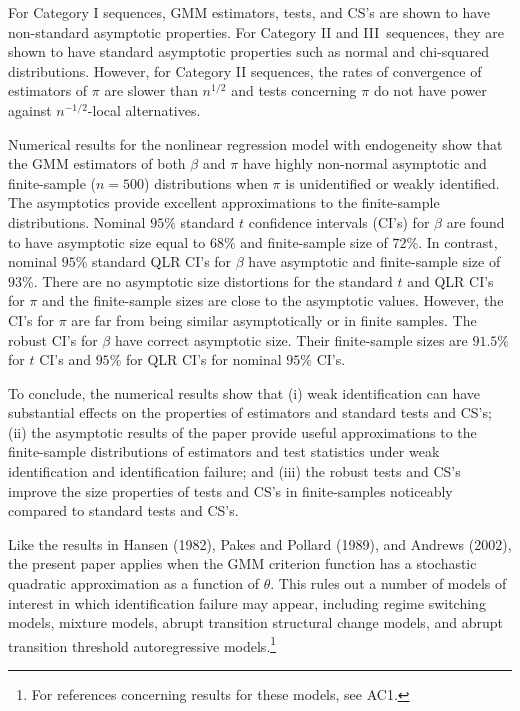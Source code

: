 \documentclass[12pt,titlepage,final,oneside,letterpaper]{article}
\begin{document}
For Category I sequences, GMM estimators, tests, and CS's are shown to have
non-standard asymptotic properties. For Category II and III\ sequences, they
are shown to have standard asymptotic properties such as normal and
chi-squared distributions. However, for Category II sequences, the rates of
convergence of estimators of $\pi $ are slower than $n^{1/2}$ and tests
concerning $\pi $ do not have power against $n^{-1/2}$-local alternatives.

Numerical results for the nonlinear regression model with endogeneity show
that the GMM estimators of both $\beta $ and $\pi $ have highly non-normal
asymptotic and finite-sample ($n=500$) distributions when $\pi $ is
unidentified or weakly identified. The asymptotics provide excellent
approximations to the finite-sample distributions. Nominal $95\%$ standard $%
t $ confidence intervals (CI's) for $\beta $ are found to have asymptotic
size equal to $68\%$ and finite-sample size of $72\%.$ In contrast, nominal $%
95\%$ standard QLR CI's for $\beta $ have asymptotic and finite-sample size
of $93\%.$ There are no asymptotic size distortions for the standard $t$ and
QLR CI's for $\pi $ and the finite-sample sizes are close to the asymptotic
values. However, the CI's for $\pi $ are far from being similar
asymptotically or in finite samples. The robust CI's for $\beta $ have
correct asymptotic size. Their finite-sample sizes are $91.5\%$ for $t$ CI's
and $95\%$ for QLR CI's for nominal $95\%$ CI's.

To conclude, the numerical results show that (i) weak identification can
have substantial effects on the properties of estimators and standard tests
and CS's; (ii) the asymptotic results of the paper provide useful
approximations to the finite-sample distributions of estimators and test
statistics under weak identification and identification failure; and (iii)
the robust tests and CS's improve the size properties of tests and CS's in
finite-samples noticeably compared to standard tests and CS's.

Like the results in Hansen (1982), Pakes and Pollard (1989), and Andrews
(2002), the present paper applies when the GMM criterion function has a
stochastic quadratic approximation as a function of $\theta .$ This rules
out a number of models of interest in which identification failure may
appear, including regime switching models, mixture models, abrupt transition
structural change models, and abrupt transition threshold autoregressive
models.\footnote{%
For references concerning results for these models, see AC1.}
\end{document}
